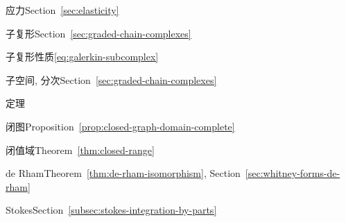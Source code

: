 \par\noindent\hspace*{0em}\label{index:stress}{应力}\quad Section~\ref{sec:elasticity}

\par\noindent\hspace*{0em}\label{index:subcomplex}{子复形}\quad Section~\ref{sec:graded-chain-complexes}

\par\noindent\hspace*{0em}\label{index:subcomplex-property}{子复形性质}\quad \eqref{eq:galerkin-subcomplex}

\par\noindent\hspace*{0em}\label{index:subspace-graded}{子空间, 分次}\quad Section~\ref{sec:graded-chain-complexes}

\par\noindent\hspace*{0em}\label{index:theorem}{定理}

\par\noindent\hspace*{1em}\label{index:theorem-closed-graph}{闭图}\quad Proposition~\ref{prop:closed-graph-domain-complete}

\par\noindent\hspace*{1em}\label{index:theorem-closed-range}{闭值域}\quad Theorem~\ref{thm:closed-range}

\par\noindent\hspace*{1em}\label{index:theorem-de-rham}{de Rham}\quad Theorem~\ref{thm:de-rham-isomorphism}, Section~\ref{sec:whitney-forms-de-rham}

\par\noindent\hspace*{1em}\label{index:theorem-stokes}{Stokes}\quad Section~\ref{subsec:stokes-integration-by-parts}

